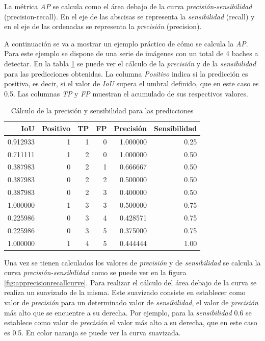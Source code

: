 La métrica \textit{AP} se calcula como el área debajo de la curva \textit{precisión-sensibilidad} (precision-recall). En el eje de las abscisas se representa la \textit{sensibilidad} (recall) y en el eje de las ordenadas se representa la \textit{precisión} (precision).

A continuación se va a mostrar un ejemplo práctico de cómo se calcula la \textit{AP}. Para este ejemplo se dispone de una serie de imágenes con un total de 4 baches a detectar. En la tabla \ref{tab:apprecisionrecalltable} se puede ver el cálculo de la \textit{precisión} y de la \textit{sensibilidad} para las predicciones obtenidas. La columna \textit{Positivo} indica si la predicción es positiva, es decir, si el valor de \textit{IoU} supera el umbral definido, que en este caso es 0.5. Las columnas \textit{TP} y \textit{FP} muestran el acumulado de sus respectivos valores.

\begin{table}[H]
	\centering
	\begin{tabular}{rrrrrr}
		\toprule
		IoU &  Positivo &  TP &  FP &  Precisión &  Sensibilidad \\
		\midrule
		0.912933 &         1 &   1 &   0 &   1.000000 &          0.25 \\
		0.711111 &         1 &   2 &   0 &   1.000000 &          0.50 \\
		0.387983 &         0 &   2 &   1 &   0.666667 &          0.50 \\
		0.387983 &         0 &   2 &   2 &   0.500000 &          0.50 \\
		0.387983 &         0 &   2 &   3 &   0.400000 &          0.50 \\
		1.000000 &         1 &   3 &   3 &   0.500000 &          0.75 \\
		0.225986 &         0 &   3 &   4 &   0.428571 &          0.75 \\
		0.225986 &         0 &   3 &   5 &   0.375000 &          0.75 \\
		1.000000 &         1 &   4 &   5 &   0.444444 &          1.00 \\
		\bottomrule
	\end{tabular}
	\caption{Cálculo de la precisión y sensibilidad para las predicciones}
	\label{tab:apprecisionrecalltable}
\end{table}

Una vez se tienen calculados los valores de \textit{precisión} y de \textit{sensibilidad} se calcula la curva \textit{precisión-sensibilidad} como se puede ver en la figura \ref{fig:apprecisionrecallcurve}. Para realizar el cálculo del área debajo de la curva se realiza un suavizado de la misma. Este suavizado consiste en establecer como valor de \textit{precisión} para un determinado valor de \textit{sensibilidad}, el valor de \textit{precisión} más alto que se encuentre a su derecha. Por ejemplo, para la \textit{sensibilidad} 0.6 se establece como valor de \textit{precisión} el valor más alto a su derecha, que en este caso es 0.5. En color naranja se puede ver la curva suavizada.

